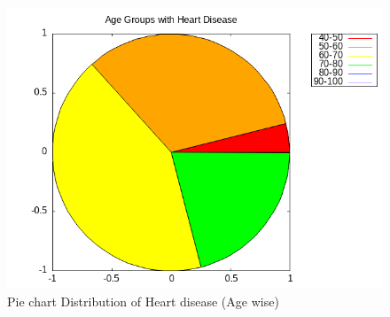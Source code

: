 \documentclass{article}
\begin{document}
	\begin{figure}[h]
		\centering
		\caption{\label{4d}Pie chart Distribution of Heart disease (Age wise)}
		\includegraphics[scale=0.7]{4d.png}
	\end{figure}
\end{document}
